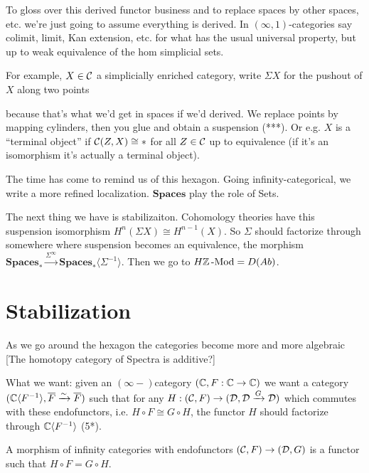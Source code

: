 \documentclass[../MH_Total.tex]{subfiles}
\begin{document}
To gloss over this derived functor business and to replace spaces by other spaces, etc. we're just going to assume everything is derived. In $(\infty,1)$-categories say colimit, limit, Kan extension, etc. for what has the usual universal property, but up to weak equivalence of the hom simplicial sets.

For example, $X \in \mathcal{C}$ a simplicially enriched category, write $\Sigma X$ for the pushout of $X$ along two points
\begin{center}
\end{center}
because that's what we'd get in spaces if we'd derived. We replace points by mapping cylinders, then you glue and obtain a suspension (***). Or e.g. $X$ is a ``terminal object'' if $\mathcal{C}(Z,X) \cong *$ for all $Z \in \mathcal{C}$ up to equivalence (if it's an isomorphism it's actually a terminal object).

The time has come to remind us of this hexagon. Going infinity-categorical, we write a more refined localization. 
$\mathbf{Spaces}$ play the role of Sets. 

The next thing we have is stabilizaiton. Cohomology theories have this suspension isomorphism $H^n(\Sigma X) \cong H^{n-1}(X)$. So $\Sigma$ should factorize through somewhere where suspension becomes an equivalence, the morphism $\mathbf{Spaces}_* \xrightarrow{\Sigma^\infty} \mathbf{Spaces}_*\langle \Sigma^{-1} \rangle$. Then we go to $H\mathbb{Z}\operatorname{-Mod} = D(Ab)$. 

\section{Stabilization}
As we go around the hexagon the categories become more and more algebraic [The homotopy category of Spectra is additive?]

What we want: given an $(\infty-)$category $(\mathbb{C},F: \mathbb{C} \to \mathbb{C})$ we want a category $(\mathbb{C}\langle F^{-1} \rangle, \overline{F} \xrightarrow{\sim} \overline{F})$ such that for any $H: (\mathcal{C},F) \to (\mathcal{D},\mathcal{D} \xrightarrow{G} \mathcal{D})$ which commutes with these endofunctors, i.e. $H \circ F \cong G \circ H$, the functor $H$ should factorize through $\mathbb{C}\langle F^{-1} \rangle$ (5*). 

A morphism of infinity categories with endofunctors $(\mathcal{C},F) \to (\mathcal{D},G)$ is a functor such that $H \circ F = G \circ H$. 
\end{document}
